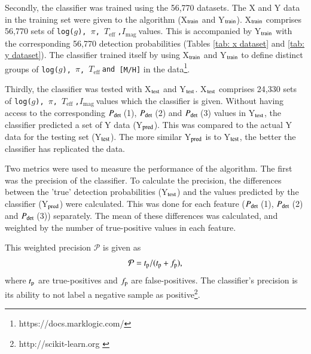 \documentclass[a4paper,fleqn,usenatbib,useAMS]{mnras}
\newcommand{\teff}{\ensuremath{T_{\textrm{eff}}\:}}
\newcommand{\pdet}{\ensuremath{P_{\rm det}\:}}
\newcommand{\imag}{\ensuremath{I_{\textrm{mag}}\:}}
\begin{document}

Secondly, the classifier was trained using the 56,770 datasets. The X and Y data in the training set were given to the algorithm (X$_{\rm train}$ and Y$_{\rm train}$). X$_{\rm train}$ comprises 56,770 sets of \texttt{log($g$), $\pi$, \teff,\:[M/H]\:\imag}values. This is accompanied by Y$_{\rm train}$ with the corresponding 56,770 detection probabilities (Tables \ref{tab: x dataset} and \ref{tab: y dataset}). The classifier trained itself by using X$_{\rm train}$ and Y$_{\rm train}$ to define distinct groups of \texttt{log($g$), $\pi$, \teff{\rm and} [M/H]} in the data\footnote{https://docs.marklogic.com/}.

Thirdly, the classifier was tested with X$_{\rm test}$ and Y$_{\rm test}$.  X$_{\rm test}$ comprises 24,330 sets of \texttt{log($g$), $\pi$, \teff,\:[M/H]\:\imag}values which the classifier is given. Without having access to the corresponding \pdet(1), \pdet(2) and \pdet(3) values in Y$_{\rm test}$, the classifier predicted a set of Y data (Y$_{\rm pred}$). This was compared to the actual Y data for the testing set (Y$_{\rm test}$). The more similar Y$_{\rm pred}$ is to Y$_{\rm test}$, the better the classifier has replicated the data.

Two metrics were used to measure the performance of the algorithm. The first was the precision of the classifier. To calculate the precision, the differences between the 'true' detection probabilities (Y$_{\rm test}$) and the values predicted by the classifier (Y$_{\rm pred}$) were calculated. This was done for each feature (\pdet(1), \pdet(2) and \pdet(3)) separately. The mean of these differences was calculated, and weighted by the number of true-positive values in each feature.

This weighted precision $\mathcal{P}$ is given as
\begin{equation}
\mathcal{P} = t_{\rm p} / (t_{\rm p} + f_{\rm p}), 
\end{equation}
where $t_{\rm p}$ are true-positives and $f_{\rm p}$ are false-positives. The classifier's precision is its ability to not label a negative sample as positive\footnote{http://scikit-learn.org \label{scikit}}.
\end{document}
